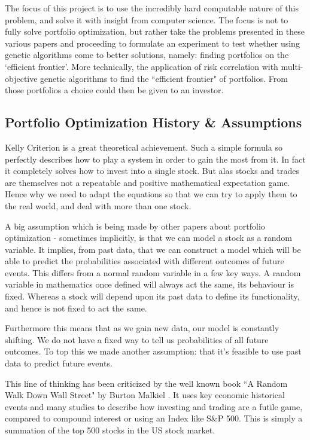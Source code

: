 \documentclass[11pt]{article}
\begin{document}
    The focus of this project is to use the incredibly hard computable nature
    of this problem, and solve it with insight from computer science. The focus
    is not to fully solve portfolio optimization, but rather take the problems
    presented in these various papers and proceeding to formulate an experiment to test
    whether using genetic algorithms come to better solutions, namely: finding portfolios on the
    `efficient frontier'. More technically,
    the application of risk correlation with multi-objective genetic algorithms
    to find the ``efficient frontier" of portfolios. From those portfolios a choice
    could then be given to an investor.

\subsection{Portfolio Optimization History \& Assumptions}

    Kelly Criterion \cite{Kelly} is a great theoretical achievement. Such a simple formula so
    perfectly describes how to play a system in order to gain the most from it. In fact
    it completely solves how to invest into a single stock. But alas
    stocks and trades are themselves not a repeatable and positive mathematical expectation
    game. Hence why we need to adapt the equations so that we can try to apply them to the
    real world, and deal with more than one stock.

    A big assumption which is being made by other papers about portfolio
    optimization - sometimes implicitly,
    is that we can model a stock as a random variable. It
    implies, from past data, that we can construct a model which will be able
    to predict the probabilities associated with different outcomes of future events.
    This differs from a normal random variable in a few key ways. A random variable in
    mathematics once defined will always act the same, its behaviour is fixed. Whereas a stock will
    depend upon its past data to define its functionality, and hence is not fixed to act
    the same.

    Furthermore this means that as we gain new data, our model is constantly shifting.
    We do not have a fixed way to tell us probabilities of all future outcomes.
    To top this we made another assumption: that it's feasible to use past data to predict
    future events.

    This line of thinking has been criticized by the well known book ``A Random Walk Down
    Wall Street" by Burton Malkiel \cite{BurtonMalkiel}. It uses
    key economic historical events and many studies to describe how investing and trading are
    a futile game, compared to compound interest or using an Index like S\&P 500. This is
    simply a summation of the top 500 stocks in the US stock market.
\end{document}
